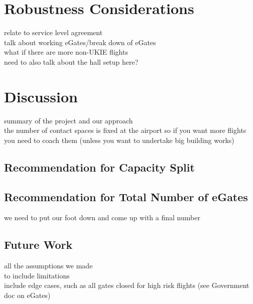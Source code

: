 \documentclass[10pt]{article}
\begin{document}
\section{Robustness Considerations}
relate to service level agreement \\
talk about working eGates/break down of eGates  \\
what if there are more non-UKIE flights  \\ 
need to also talk about the hall setup here?



\section{Discussion}
summary of the project and our approach \\
the number of contact spaces is fixed at the airport so if you want more flights you need to coach them (unless you want to undertake big building works)

\subsection{Recommendation for Capacity Split}

\subsection{Recommendation for Total Number of eGates}
we need to put our foot down and come up with a final number

\subsection{Future Work}
all the assumptions we made \\
to include limitations \\
include edge cases, such as all gates closed for high risk flights (see Government doc on eGates) 


\end{document}
